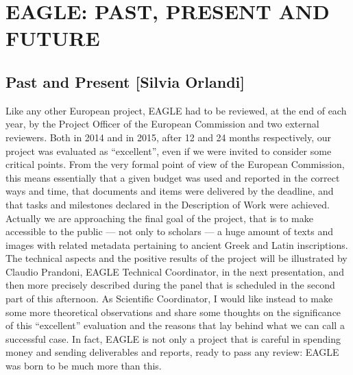 \chapter{EAGLE: PAST, PRESENT AND FUTURE}

\section{Past and Present [Silvia Orlandi]}
Like any other European project, EAGLE had to be reviewed, at the end of each year, by the Project Officer of the European Commission and two external reviewers. Both in 2014 and in 2015, after 12 and 24 months respectively, our project was evaluated as ``excellent'', even if we were invited to consider some critical points. From the very formal point of view of the European Commission, this means essentially that a given budget was used and reported in the correct ways and time, that documents and items were delivered by the deadline, and that tasks and milestones declared in the Description of Work were achieved.
Actually we are approaching the final goal of the project, that is to make accessible to the public --- not only to scholars --- a huge amount of texts and images with related metadata pertaining to ancient Greek and Latin inscriptions. The technical aspects and the positive results of the project will be illustrated by Claudio Prandoni, EAGLE Technical Coordinator, in the next presentation, and then more precisely described during the panel that is scheduled in the second part of this afternoon. As Scientific Coordinator, I would like instead to make some more theoretical observations and share some thoughts on the significance of this ``excellent'' evaluation and the reasons that lay behind what we can call a successful case.
In fact, EAGLE is not only a project that is careful in spending money and sending deliverables and reports, ready to pass any review: EAGLE was born to be much more than this.
